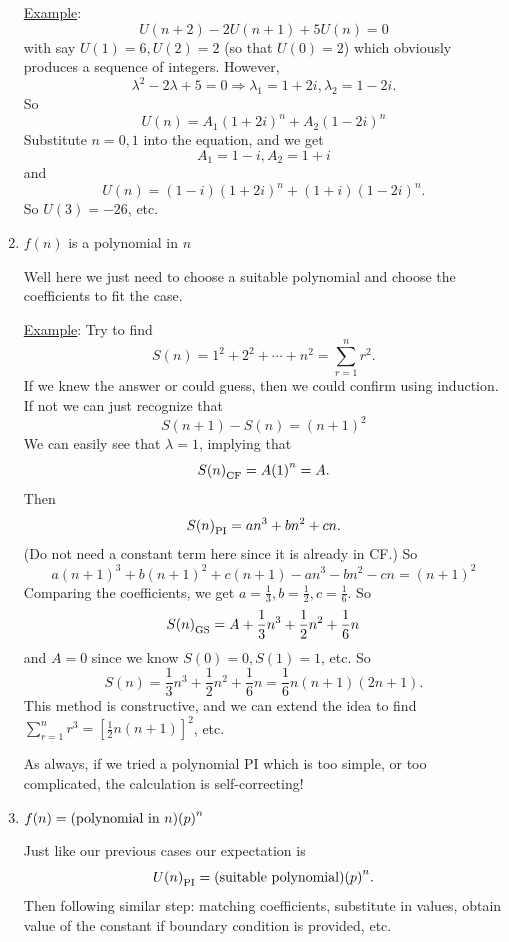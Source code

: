 \documentclass[12pt]{report}
\theoremstyle{definition}
\begin{document}
\begin{enumerate}[label = (\alph*)]
        \underline{Example}: \[
            U(n+2) - 2 U(n+1) + 5U(n) = 0
        \]with say $U(1) = 6, U(2) = 2$ (so that $U(0) = 2$) 
        which obviously produces a sequence of integers.
        However,\[
            \lambda^{2} - 2\lambda + 5 = 0 \Rightarrow{} \lambda_1 = 1 + 2i, \lambda_2 = 1 - 2i.
        \]So\[
        U(n) = A_1 {(1 + 2i)}^{n} + A_2 {(1 - 2i)}^{n}
        \]Substitute $n = 0, 1$ into the equation, and we get\[
            A_1 = 1 - i, A_2 = 1 + i
        \]and\[
        U(n) = (1 - i){(1 + 2i)}^{n} + (1 + i){(1 - 2i)}^{n}.
    \]So $U(3) = -26$, etc.

\item $f(n)$ is a polynomial in $n$

    Well here we just need to choose a suitable polynomial and choose the coefficients
    to fit the case.

    \underline{Example}: Try to find \[
      S(n) = 1^2 + 2^2 + \cdots + n^2 = \sum_{r=1}^{n} r^2.
    \]
    If we knew the answer or could guess, then we could confirm using induction.
    If not we can just recognize that \[
        S(n+1) - S(n) = {(n + 1)}^{2}
    \]We can easily see that $\lambda = 1$, implying that\[
    {S(n)}_{\textnormal{CF}} = A{(1)}^{n} = A.
    \]Then\[
    {S(n)}_{\textnormal{PI}} = an^{3} + bn^{2} + cn.
\] (Do not need a constant term here since it is already in CF.) So\[
a{(n + 1)}^{3} + b{(n + 1)}^{2} + c(n + 1) - an^{3} - bn^{2} - cn = {(n + 1)}^{2}
\]Comparing the coefficients, we get $a = \frac{1}{3}, b = \frac{1}{2}, c = \frac{1}{6}$.
So \[
    {S(n)}_{\textnormal{GS}} = A + \frac{1}{3}n^{3} + \frac{1}{2}n^{2} + \frac{1}{6}n
\]and $A = 0$ since we know $S(0) = 0, S(1) = 1$, etc. So\[
S(n) = \frac{1}{3}n^{3} + \frac{1}{2}n^{2} + \frac{1}{6}n = \frac{1}{6}n(n+1)(2n+1).
\]
This method is constructive, and we can extend the idea to find
$\sum_{r=1}^{n} r^{3} = {\left[\frac{1}{2}n(n+1)\right]}^{2}$, etc.

As always, if we tried a polynomial PI which is too simple, or too complicated,
the calculation is self-correcting!

\item $f(n) = (\textnormal{polynomial in $n$}) {(p)}^{n}$

    Just like our previous cases our expectation is\[
        {U(n)}_{\textnormal{PI}} = (\textnormal{suitable polynomial}){(p)}^{n}.
    \]Then following similar step: matching coefficients, substitute in values, 
    obtain value of the constant if boundary condition is provided, etc.
\end{enumerate}
\end{document}
